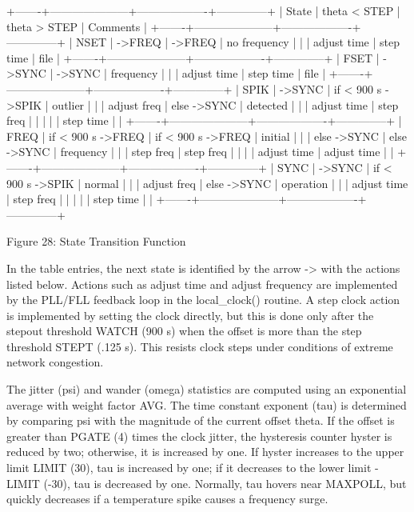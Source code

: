   +-------+---------------------+-------------------+--------------+
  | State | theta < STEP        | theta > STEP      | Comments     |
  +-------+---------------------+-------------------+--------------+
  | NSET  | ->FREQ              | ->FREQ            | no frequency |
  |       | adjust time         | step time         | file         |
  +-------+---------------------+-------------------+--------------+
  | FSET  | ->SYNC              | ->SYNC            | frequency    |
  |       | adjust time         | step time         | file         |
  +-------+---------------------+-------------------+--------------+
  | SPIK  | ->SYNC              | if < 900 s ->SPIK | outlier      |
  |       | adjust freq         | else ->SYNC       | detected     |
  |       | adjust time         | step freq         |              |
  |       |                     | step time         |              |
  +-------+---------------------+-------------------+--------------+
  | FREQ  | if < 900 s ->FREQ   | if < 900 s ->FREQ | initial      |
  |       | else ->SYNC         | else ->SYNC       | frequency    |
  |       | step freq           | step freq         |              |
  |       | adjust time         | adjust time       |              |
  +-------+---------------------+-------------------+--------------+
  | SYNC  | ->SYNC              | if < 900 s ->SPIK | normal       |
  |       | adjust freq         | else ->SYNC       | operation    |
  |       | adjust time         | step freq         |              |
  |       |                     | step time         |              |
  +-------+---------------------+-------------------+--------------+

                Figure 28: State Transition Function

In the table entries, the next state is identified by the arrow ->
with the actions listed below.  Actions such as adjust time and
adjust frequency are implemented by the PLL/FLL feedback loop in the
local_clock() routine.  A step clock action is implemented by setting
the clock directly, but this is done only after the stepout threshold
WATCH (900 s) when the offset is more than the step threshold STEPT
(.125 s).  This resists clock steps under conditions of extreme
network congestion.

The jitter (psi) and wander (omega) statistics are computed using an
exponential average with weight factor AVG.  The time constant
exponent (tau) is determined by comparing psi with the magnitude of
the current offset theta.  If the offset is greater than PGATE (4)
times the clock jitter, the hysteresis counter hyster is reduced by
two; otherwise, it is increased by one.  If hyster increases to the
upper limit LIMIT (30), tau is increased by one; if it decreases to
the lower limit -LIMIT (-30), tau is decreased by one.  Normally, tau
hovers near MAXPOLL, but quickly decreases if a temperature spike
causes a frequency surge.
